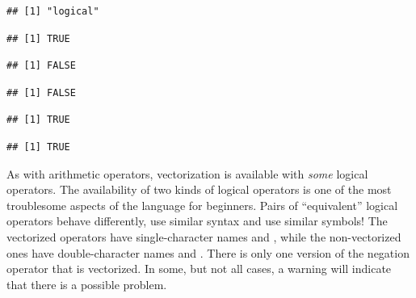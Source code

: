 \documentclass[krantz2]{krantz}\usepackage{knitr}
\begin{document}
\begin{knitrout}\footnotesize
{}\color{fgcolor}\begin{kframe}
\begin{alltt}
 \hlkwb{<-} 
 \hlkwb{<-} 
\end{alltt}
\begin{verbatim}
## [1] "logical"
\end{verbatim}
\begin{alltt}
\end{alltt}
\begin{verbatim}
## [1] TRUE
\end{verbatim}
\begin{alltt}
\hlopt{!} 
\end{alltt}
\begin{verbatim}
## [1] FALSE
\end{verbatim}
\begin{alltt}
 \hlopt{&&}  
\end{alltt}
\begin{verbatim}
## [1] FALSE
\end{verbatim}
\begin{alltt}
 \hlopt{||}  
\end{alltt}
\begin{verbatim}
## [1] TRUE
\end{verbatim}
\begin{alltt}
 
\end{alltt}
\begin{verbatim}
## [1] TRUE
\end{verbatim}
\end{kframe}
\end{knitrout}

As with arithmetic operators, vectorization is available with \emph{some} logical operators. The availability of two kinds of logical operators is one of the most troublesome aspects of the \Rlang language for beginners. Pairs of ``equivalent'' logical operators behave differently, use similar syntax and use similar symbols! The vectorized operators have single-character names \Roperator{\&} and \Roperator{\textbar}, while the non-vectorized ones have double-character names \Roperator{\&\&} and \Roperator{\textbar\textbar}. There is only one version of the negation operator \Roperator{!} that is vectorized. In some, but not all cases, a warning will indicate that there is a possible problem.
\end{document}
